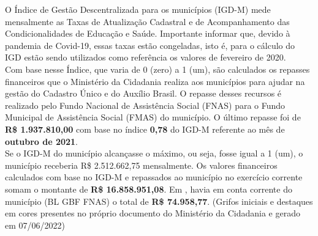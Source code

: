 \documentclass[14pt]{extarticle}
\begin{document}
\begin{trivlist}\leftskip=4cm
\item\small O Índice de Gestão Descentralizada para os municípios (IGD-M) mede mensalmente as Taxas de Atualização Cadastral e de Acompanhamento das Condicionalidades de Educação e Saúde. Importante informar que, devido à pandemia de Covid-19, essas taxas estão congeladas, isto é, para o cálculo do IGD estão sendo utilizados como referência os valores de fevereiro de 2020.\\

Com base nesse Índice, que varia de 0 (zero) a 1 (um), são calculados os repasses financeiros que o Ministério da Cidadania realiza aos municípios para ajudar na gestão do Cadastro Único e do Auxílio Brasil.
O repasse desses recursos é realizado pelo Fundo Nacional de Assistência Social (FNAS) para o Fundo Municipal de Assistência Social (FMAS) do município. O último repasse foi de \textbf{R\$ 1.937.810,00} com base no índice \textbf{0,78} do IGD-M referente ao mês de \textbf{outubro de 2021}.\\

Se o IGD-M do município alcançasse o máximo, ou seja, fosse igual a 1 (um), o município receberia R\$ 2.512.662,75 mensalmente.
Os valores financeiros calculados com base no IGD-M e repassados ao município no exercício corrente somam o montante de \textbf{R\$ 16.858.951,08}. Em , havia em conta corrente do município (BL GBF FNAS) o total de \textbf{R\$ 74.958,77}. (Grifos iniciais e destaques em cores presentes no próprio documento do Ministério da Cidadania e gerado em 07/06/2022)
\end{trivlist}
\end{document}
